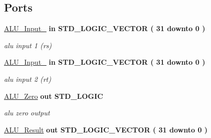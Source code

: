 \subsection*{Ports}
 \begin{DoxyCompactItemize}
\item 
\hyperlink{class_a_l_u_a914f203651b8887062dd7432ef37b92a}{A\-L\-U\-\_\-\-Input\-\_}  {\bfseries {\bfseries \textcolor{vhdlkeyword}{in}\textcolor{vhdlchar}{ }}} {\bfseries \textcolor{comment}{S\-T\-D\-\_\-\-L\-O\-G\-I\-C\-\_\-\-V\-E\-C\-T\-O\-R}\textcolor{vhdlchar}{ }\textcolor{vhdlchar}{(}\textcolor{vhdlchar}{ }\textcolor{vhdlchar}{ } \textcolor{vhdldigit}{31} \textcolor{vhdlchar}{ }\textcolor{vhdlchar}{ }\textcolor{vhdlchar}{ }\textcolor{vhdlkeyword}{downto}\textcolor{vhdlchar}{ }\textcolor{vhdlchar}{ }\textcolor{vhdlchar}{ } \textcolor{vhdldigit}{0} \textcolor{vhdlchar}{ }\textcolor{vhdlchar}{)}\textcolor{vhdlchar}{ }} 
\begin{DoxyCompactList}\small\item\em alu input 1 (rs) \end{DoxyCompactList}\item 
\hyperlink{class_a_l_u_aa3b3b0b101b8269e00ade1a474bb35e0}{A\-L\-U\-\_\-\-Input\-\_}  {\bfseries {\bfseries \textcolor{vhdlkeyword}{in}\textcolor{vhdlchar}{ }}} {\bfseries \textcolor{comment}{S\-T\-D\-\_\-\-L\-O\-G\-I\-C\-\_\-\-V\-E\-C\-T\-O\-R}\textcolor{vhdlchar}{ }\textcolor{vhdlchar}{(}\textcolor{vhdlchar}{ }\textcolor{vhdlchar}{ } \textcolor{vhdldigit}{31} \textcolor{vhdlchar}{ }\textcolor{vhdlchar}{ }\textcolor{vhdlchar}{ }\textcolor{vhdlkeyword}{downto}\textcolor{vhdlchar}{ }\textcolor{vhdlchar}{ }\textcolor{vhdlchar}{ } \textcolor{vhdldigit}{0} \textcolor{vhdlchar}{ }\textcolor{vhdlchar}{)}\textcolor{vhdlchar}{ }} 
\begin{DoxyCompactList}\small\item\em alu input 2 (rt) \end{DoxyCompactList}\item 
\hyperlink{class_a_l_u_aa94d8e6050f382eeb04dc3c7ac380f2e}{A\-L\-U\-\_\-\-Zero}  {\bfseries {\bfseries \textcolor{vhdlkeyword}{out}\textcolor{vhdlchar}{ }}} {\bfseries \textcolor{comment}{S\-T\-D\-\_\-\-L\-O\-G\-I\-C}\textcolor{vhdlchar}{ }} 
\begin{DoxyCompactList}\small\item\em alu zero output \end{DoxyCompactList}\item 
\hyperlink{class_a_l_u_ac6d90f6d382114c0cfadc2c2cdc6559f}{A\-L\-U\-\_\-\-Result}  {\bfseries {\bfseries \textcolor{vhdlkeyword}{out}\textcolor{vhdlchar}{ }}} {\bfseries \textcolor{comment}{S\-T\-D\-\_\-\-L\-O\-G\-I\-C\-\_\-\-V\-E\-C\-T\-O\-R}\textcolor{vhdlchar}{ }\textcolor{vhdlchar}{(}\textcolor{vhdlchar}{ }\textcolor{vhdlchar}{ } \textcolor{vhdldigit}{31} \textcolor{vhdlchar}{ }\textcolor{vhdlchar}{ }\textcolor{vhdlchar}{ }\textcolor{vhdlkeyword}{downto}\textcolor{vhdlchar}{ }\textcolor{vhdlchar}{ }\textcolor{vhdlchar}{ } \textcolor{vhdldigit}{0} \textcolor{vhdlchar}{ }\textcolor{vhdlchar}{)}\textcolor{vhdlchar}{ }} 

\end{DoxyCompactItemize}

